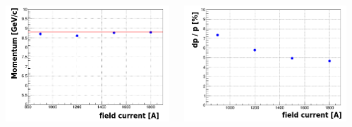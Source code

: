\documentclass[dvipsnames, aspectratio=43] {beamer}
\begin{document}
\begin{frame}
\begin{columns}[t]
\begin{block}{}
    \end{block}
    \begin{block}{}
      \includegraphics[width=1.\linewidth]{momBeam_run6.png}
    \end{block}
    \begin{block}{}
      \includegraphics[width=1.\linewidth]{momResBeam_run6.png}
    \end{block}
  \end{columns}
\end{frame}
\end{document}
